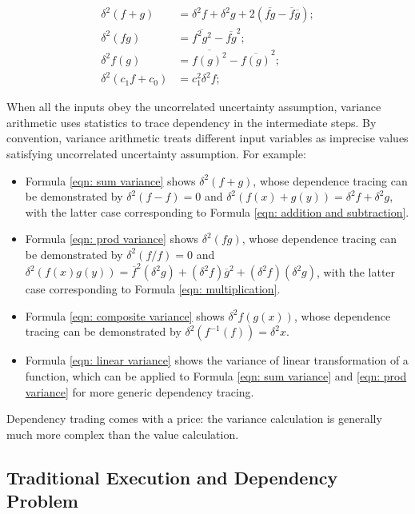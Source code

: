 \documentclass[twoside]{article}
\numberwithin{equation}{section}
\begin{document}
\fi

\begin{align}
\label{eqn: sum variance}
\delta^2 (f + g) &= \delta^2 f + \delta^2 g + 2 (\overline{fg} - \overline{f}\overline{g}); \\
\label{eqn: prod variance}
\delta^2 (f g) &= \overline{f^2 g^2} - \overline{f g}^2; \\
\label{eqn: composite variance}
\delta^2 f(g) &= \overline{f(g)^2} - \overline{f(g)}^2; \\
\label{eqn: linear variance}
\delta^2 (c_1 f + c_0) &= c_1^2 \delta^2f; 
\end{align}

When all the inputs obey the uncorrelated uncertainty assumption, variance arithmetic uses statistics to trace dependency in the intermediate steps.
By convention, variance arithmetic treats different input variables as imprecise values satisfying uncorrelated uncertainty assumption.
For example:
\begin{itemize}
\item Formula \eqref{eqn: sum variance} shows $\delta^2 (f + g)$, whose dependence tracing can be demonstrated by $\delta^2 (f - f) = 0$  and $\delta^2 (f(x) + g(y)) = \delta^2 f + \delta^2 g$, with the latter case corresponding to Formula \eqref{eqn: addition and subtraction}.   

\item Formula \eqref{eqn: prod variance} shows  $\delta^2 (f g)$, whose dependence tracing can be demonstrated by $\delta^2 (f/f) = 0$  and $\delta^2 (f(x) g(y)) = \overline{f}^2 (\delta^2 g) + (\delta^2 f) \overline{g}^2 +  (\delta^2 f) (\delta^2 g)$, with the latter case corresponding to Formula \eqref{eqn: multiplication}.  

\item Formula \eqref{eqn: composite variance} shows  $\delta^2 f(g(x))$, whose dependence tracing can be demonstrated by $\delta^2 (f^{-1}(f)) = \delta^2 x$.  

\item Formula \eqref{eqn: linear variance} shows the variance of linear transformation of a function, which can be applied to Formula \eqref{eqn: sum variance} and \eqref{eqn: prod variance} for more generic dependency tracing.
\end{itemize}
Dependency trading comes with a price: the variance calculation is generally much more complex than the value calculation.


\subsection{Traditional Execution and Dependency Problem}
\end{document}
